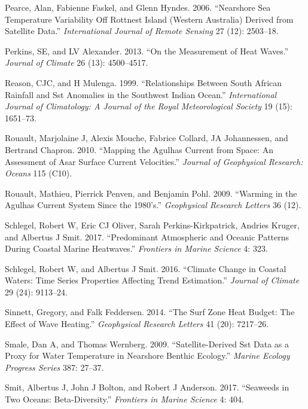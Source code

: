 \documentclass[12pt,a4paper,]{article}
\begin{document}
\leavevmode\hypertarget{ref-Pearce2006}{}%
Pearce, Alan, Fabienne Faskel, and Glenn Hyndes. 2006. ``Nearshore Sea
Temperature Variability Off Rottnest Island (Western Australia) Derived
from Satellite Data.'' \emph{International Journal of Remote Sensing} 27
(12): 2503--18.

\leavevmode\hypertarget{ref-Perkins2013}{}%
Perkins, SE, and LV Alexander. 2013. ``On the Measurement of Heat
Waves.'' \emph{Journal of Climate} 26 (13): 4500--4517.

\leavevmode\hypertarget{ref-Reason1999}{}%
Reason, CJC, and H Mulenga. 1999. ``Relationships Between South African
Rainfall and Sst Anomalies in the Southwest Indian Ocean.''
\emph{International Journal of Climatology: A Journal of the Royal
Meteorological Society} 19 (15): 1651--73.

\leavevmode\hypertarget{ref-Rouault2010}{}%
Rouault, Marjolaine J, Alexis Mouche, Fabrice Collard, JA Johannessen,
and Bertrand Chapron. 2010. ``Mapping the Agulhas Current from Space: An
Assessment of Asar Surface Current Velocities.'' \emph{Journal of
Geophysical Research: Oceans} 115 (C10).

\leavevmode\hypertarget{ref-Rouault2009}{}%
Rouault, Mathieu, Pierrick Penven, and Benjamin Pohl. 2009. ``Warming in
the Agulhas Current System Since the 1980's.'' \emph{Geophysical
Research Letters} 36 (12).

\leavevmode\hypertarget{ref-Schlegel2017}{}%
Schlegel, Robert W, Eric CJ Oliver, Sarah Perkins-Kirkpatrick, Andries
Kruger, and Albertus J Smit. 2017. ``Predominant Atmospheric and Oceanic
Patterns During Coastal Marine Heatwaves.'' \emph{Frontiers in Marine
Science} 4: 323.

\leavevmode\hypertarget{ref-Schlegel2016}{}%
Schlegel, Robert W, and Albertus J Smit. 2016. ``Climate Change in
Coastal Waters: Time Series Properties Affecting Trend Estimation.''
\emph{Journal of Climate} 29 (24): 9113--24.

\leavevmode\hypertarget{ref-Sinnett2014}{}%
Sinnett, Gregory, and Falk Feddersen. 2014. ``The Surf Zone Heat Budget:
The Effect of Wave Heating.'' \emph{Geophysical Research Letters} 41
(20): 7217--26.

\leavevmode\hypertarget{ref-Smale2009}{}%
Smale, Dan A, and Thomas Wernberg. 2009. ``Satellite-Derived Sst Data as
a Proxy for Water Temperature in Nearshore Benthic Ecology.''
\emph{Marine Ecology Progress Series} 387: 27--37.

\leavevmode\hypertarget{ref-Smit2017}{}%
Smit, Albertus J, John J Bolton, and Robert J Anderson. 2017. ``Seaweeds
in Two Oceans: Beta-Diversity.'' \emph{Frontiers in Marine Science} 4:
404.
\end{document}
